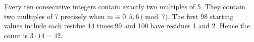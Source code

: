 Every ten consecutive integers contain exactly two multiples of 5. They contain two multiples of 7 precisely when $m\equiv0,5,6\pmod7$. The first 98 starting values include each residue 14 times;99 and 100 have residues 1 and 2. Hence the count is $3\cdot14=\boxed{42}$.
